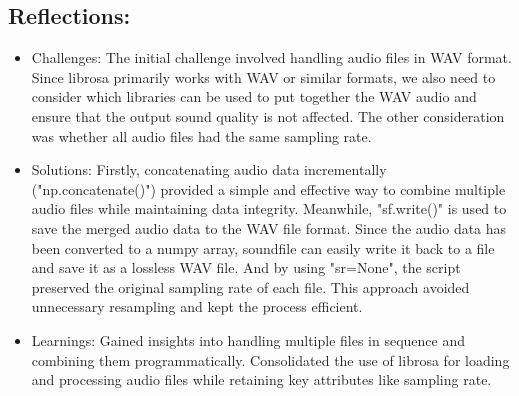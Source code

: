 \documentclass{../labbook}
\begin{document}
\begin{solution}

\subsection{Reflections:}
\begin{itemize}
\item Challenges: The initial challenge involved handling audio files in WAV format. Since librosa primarily works with WAV or similar formats, we also need to consider which libraries can be used to put together the WAV audio and ensure that the output sound quality is not affected.
The other consideration was whether all audio files had the same sampling rate. 
\item Solutions: Firstly, concatenating audio data incrementally ("np.concatenate()") provided a simple and effective way to combine multiple audio files while maintaining data integrity. 
Meanwhile, "sf.write()" is used to save the merged audio data to the WAV file format. Since the audio data has been converted to a numpy array, soundfile can easily write it back to a file and save it as a lossless WAV file.
And by using "sr=None", the script preserved the original sampling rate of each file. This approach avoided unnecessary resampling and kept the process efficient.
\item Learnings: Gained insights into handling multiple files in sequence and combining them programmatically. Consolidated the use of librosa for loading and processing audio files while retaining key attributes like sampling rate.
\end{itemize}


\end{solution}
\end{document}
